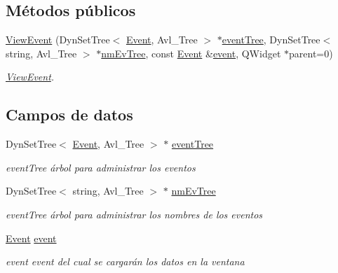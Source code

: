 \subsection*{Métodos públicos}
\begin{DoxyCompactItemize}
\item 
\hyperlink{class_view_event_aa658be5ff516e8b7ba6f611ef350ce86}{View\+Event} (Dyn\+Set\+Tree$<$ \hyperlink{class_event}{Event}, Avl\+\_\+\+Tree $>$ $\ast$\hyperlink{class_view_event_a4a5575a712fa3139027258e5f2bb1201}{event\+Tree}, Dyn\+Set\+Tree$<$ string, Avl\+\_\+\+Tree $>$ $\ast$\hyperlink{class_view_event_a37f2e050e0d8b837d40bdaa6f81aab20}{nm\+Ev\+Tree}, const \hyperlink{class_event}{Event} \&\hyperlink{class_view_event_a3a9469ca9e317bfc5bce5d9341d0b2a1}{event}, Q\+Widget $\ast$parent=0)
\begin{DoxyCompactList}\small\item\em \hyperlink{class_view_event}{View\+Event}. \end{DoxyCompactList}\end{DoxyCompactItemize}
\subsection*{Campos de datos}
\begin{DoxyCompactItemize}
\item 
Dyn\+Set\+Tree$<$ \hyperlink{class_event}{Event}, Avl\+\_\+\+Tree $>$ $\ast$ \hyperlink{class_view_event_a4a5575a712fa3139027258e5f2bb1201}{event\+Tree}\hypertarget{class_view_event_a4a5575a712fa3139027258e5f2bb1201}{}\label{class_view_event_a4a5575a712fa3139027258e5f2bb1201}

\begin{DoxyCompactList}\small\item\em event\+Tree árbol para administrar los eventos \end{DoxyCompactList}\item 
Dyn\+Set\+Tree$<$ string, Avl\+\_\+\+Tree $>$ $\ast$ \hyperlink{class_view_event_a37f2e050e0d8b837d40bdaa6f81aab20}{nm\+Ev\+Tree}\hypertarget{class_view_event_a37f2e050e0d8b837d40bdaa6f81aab20}{}\label{class_view_event_a37f2e050e0d8b837d40bdaa6f81aab20}

\begin{DoxyCompactList}\small\item\em event\+Tree árbol para administrar los nombres de los eventos \end{DoxyCompactList}\item 
\hyperlink{class_event}{Event} \hyperlink{class_view_event_a3a9469ca9e317bfc5bce5d9341d0b2a1}{event}\hypertarget{class_view_event_a3a9469ca9e317bfc5bce5d9341d0b2a1}{}\label{class_view_event_a3a9469ca9e317bfc5bce5d9341d0b2a1}

\begin{DoxyCompactList}\small\item\em event event del cual se cargarán los datos en la ventana \end{DoxyCompactList}\end{DoxyCompactItemize}


